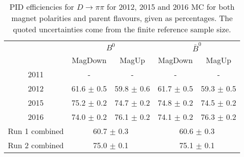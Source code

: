 \begin{table}[H]
    \centering
    \begin{tabular}{ccccc}
        \toprule
        & \multicolumn{2}{c}{$B^0$} &  \multicolumn{2}{c}{$\bar{B}^0$}\\
        & MagDown & MagUp & MagDown & MagUp\\
        \midrule
2011 & - & - & - & - \\
2012 & 61.6 $\pm$ 0.5 & 59.8 $\pm$ 0.6 & 61.7 $\pm$ 0.5 & 59.3 $\pm$ 0.5 \\
2015 & 75.2 $\pm$ 0.2 & 74.7 $\pm$ 0.2 & 74.8 $\pm$ 0.2 & 74.5 $\pm$ 0.2 \\
2016 & 74.0 $\pm$ 0.2 & 76.1 $\pm$ 0.2 & 74.1 $\pm$ 0.2 & 76.3 $\pm$ 0.2 \\
        \midrule
Run 1 combined & \multicolumn{2}{c}{60.7 $\pm$ 0.3} & \multicolumn{2}{c}{60.6 $\pm$ 0.3} \\
Run 2 combined & \multicolumn{2}{c}{75.0 $\pm$ 0.1} & \multicolumn{2}{c}{75.1 $\pm$ 0.1} \\
        \bottomrule
    \end{tabular}
    \caption{PID efficiencies for $D \to \pi\pi$ for 2012, 2015 and 2016 MC for both magnet polarities and parent flavours, given as percentages. The quoted  uncertainties come from the finite reference sample size.}
\label{tab:PID_efficiency_pipi}
\end{table}
